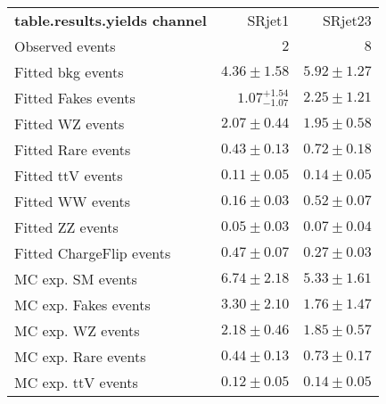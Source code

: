 

\begin{table}
\begin{center}
\setlength{\tabcolsep}{0.0pc}
{\small
\begin{tabular*}{\textwidth}{@{\extracolsep{\fill}}lrr}
\noalign{\smallskip}\hline\noalign{\smallskip}
{\bf table.results.yields channel}           & SRjet1            & SRjet23              \\[-0.05cm]
\noalign{\smallskip}\hline\noalign{\smallskip}
Observed events          & $2$              & $8$                    \\
\noalign{\smallskip}\hline\noalign{\smallskip}
Fitted bkg events         & $4.36 \pm 1.58$          & $5.92 \pm 1.27$              \\
\noalign{\smallskip}\hline\noalign{\smallskip}
        Fitted Fakes events         & $1.07_{-1.07}^{+1.54}$          & $2.25 \pm 1.21$              \\
        Fitted WZ events         & $2.07 \pm 0.44$          & $1.95 \pm 0.58$              \\
        Fitted Rare events         & $0.43 \pm 0.13$          & $0.72 \pm 0.18$              \\
        Fitted ttV events         & $0.11 \pm 0.05$          & $0.14 \pm 0.05$              \\
        Fitted WW events         & $0.16 \pm 0.03$          & $0.52 \pm 0.07$              \\
        Fitted ZZ events         & $0.05 \pm 0.03$          & $0.07 \pm 0.04$              \\
        Fitted ChargeFlip events         & $0.47 \pm 0.07$          & $0.27 \pm 0.03$              \\
 \noalign{\smallskip}\hline\noalign{\smallskip}
MC exp. SM events              & $6.74 \pm 2.18$          & $5.33 \pm 1.61$              \\
\noalign{\smallskip}\hline\noalign{\smallskip}
        MC exp. Fakes events         & $3.30 \pm 2.10$          & $1.76 \pm 1.47$              \\
        MC exp. WZ events         & $2.18 \pm 0.46$          & $1.85 \pm 0.57$              \\
        MC exp. Rare events         & $0.44 \pm 0.13$          & $0.73 \pm 0.17$              \\
        MC exp. ttV events         & $0.12 \pm 0.05$          & $0.14 \pm 0.05$              \\

\end{tabular*}}
\end{center}
\end{table}
